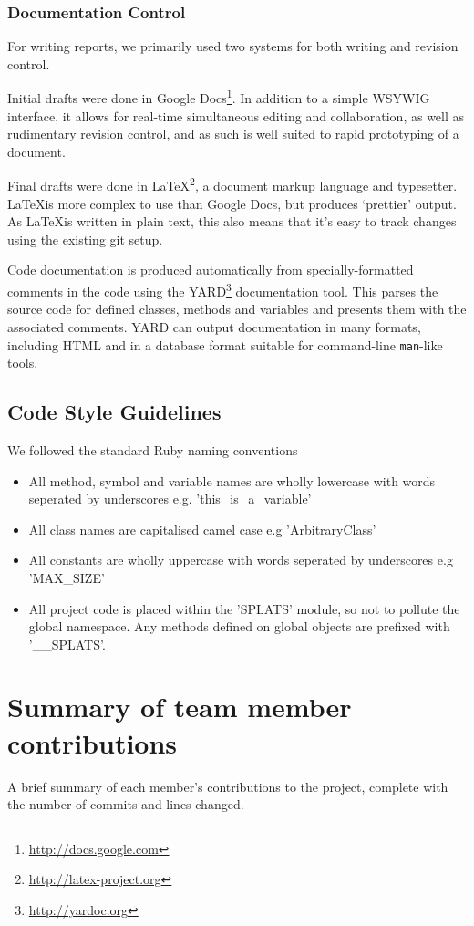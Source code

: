     \subsubsection{Documentation Control}
      For writing reports, we primarily used two systems for both writing and revision control.

      Initial drafts were done in Google Docs\footnote{\url{http://docs.google.com}}.
      In addition to a simple WSYWIG interface, it allows for real-time simultaneous editing and collaboration, as well as rudimentary revision control, and as such is well suited to rapid prototyping of a document.

      Final drafts were done in \LaTeX\footnote{\url{http://latex-project.org}}, a document markup language and typesetter.
      \LaTeX is more complex to use than Google Docs, but produces `prettier' output. As \LaTeX is written in plain text, this also means that it's easy to track changes using the existing git setup.

      Code documentation is produced automatically from specially-formatted
comments in the code using the YARD\footnote{\url{http://yardoc.org}} documentation tool. This parses the source
code for defined classes, methods and variables and presents them with the
associated comments. YARD can output documentation in many formats, including
HTML and in a database format suitable for command-line \texttt{man}-like tools.

  \subsection{Code Style Guidelines}
  We followed the standard Ruby naming conventions
    \begin{itemize}
      \item All method, symbol and variable names are wholly lowercase with words seperated by underscores e.g. 'this\_is\_a\_variable'
      \item All class names are capitalised camel case e.g 'ArbitraryClass'
      \item All constants are wholly uppercase with words seperated by underscores e.g 'MAX\_SIZE'
      \item All project code is placed within the 'SPLATS' module, so not to
pollute the global namespace. Any methods defined on global
objects are prefixed with '\_\_SPLATS'.
    \end{itemize}


\section{Summary of team member contributions}
  A brief summary of each member's contributions to the project, complete with the number of commits and lines changed.

